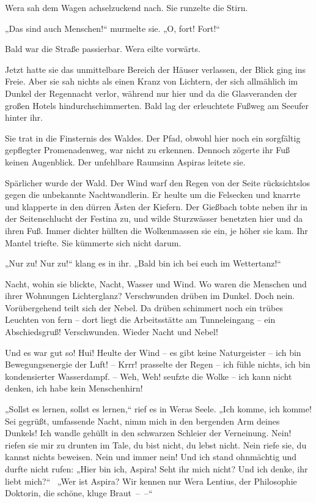 Wera sah dem Wagen achselzuckend nach. Sie runzelte die Stirn.

„Das sind auch Menschen!“ murmelte sie. „O, fort! Fort!“

Bald war die Straße passierbar. Wera eilte vorwärts.

Jetzt hatte sie das unmittelbare Bereich der Häuser verlassen, der
Blick ging ins Freie. Aber sie sah nichts als einen Kranz von
Lichtern, der sich allmählich im Dunkel der Regennacht verlor,
während nur hier und da die Glasveranden der großen Hotels
hindurchschimmerten. Bald lag der erleuchtete Fußweg am Seeufer
hinter ihr.

Sie trat in die Finsternis des Waldes. Der Pfad, obwohl hier noch
ein sorgfältig gepflegter Promenadenweg, war nicht zu erkennen.
Dennoch zögerte ihr Fuß keinen Augenblick. Der unfehlbare Raumsinn
Aspiras leitete sie.

Spärlicher wurde der Wald. Der Wind warf den Regen von der Seite
rücksichtslos gegen die unbekannte Nachtwandlerin. Er heulte um die
Felsecken und knarrte und klapperte in den dürren Ästen der
Kiefern. Der Gießbach tobte neben ihr in der Seitenschlucht der
Festina zu, und wilde Sturzwässer benetzten hier und da ihren Fuß.
Immer dichter hüllten die Wolkenmassen sie ein, je höher sie kam.
Ihr Mantel triefte. Sie kümmerte sich nicht darum.

„Nur zu! Nur zu!“ klang es in ihr. „Bald bin ich bei euch im
Wettertanz!“

Nacht, wohin sie blickte, Nacht, Wasser und Wind. Wo waren die
Menschen und ihrer Wohnungen Lichterglanz? Verschwunden drüben im
Dunkel. Doch nein. Vorübergehend teilt sich der Nebel. Da drüben
schimmert noch ein trübes Leuchten von fern – dort liegt die
Arbeitsstätte am Tunneleingang – ein Abschiedsgruß! Verschwunden.
Wieder Nacht und Nebel!

Und es war gut so! Hui! Heulte der Wind – es gibt keine
Naturgeister – ich bin Bewegungsenergie der Luft! – Krrr! prasselte
der Regen – ich fühle nichts, ich bin kondensierter Wasserdampf. –
Weh, Weh! seufzte die Wolke – ich kann nicht denken, ich habe kein
Menschenhirn!

„Sollst es lernen, sollst es lernen,“ rief es in Weras Seele. „Ich
komme, ich komme! Sei gegrüßt, umfassende Nacht, nimm mich in den
bergenden Arm deines Dunkels! Ich wandle gehüllt in den schwarzen
Schleier der Verneinung. Nein! riefen sie mir zu drunten im Tale,
du bist nicht, du lebst nicht. Nein riefe sie, du kannst nichts
beweisen. Nein und immer nein! Und ich stand ohnmächtig und durfte
nicht rufen: „Hier bin ich, Aspira! Seht ihr mich nicht? Und ich
denke, ihr liebt mich?“~ „Wer ist Aspira? Wir kennen nur Wera
Lentius, der Philosophie Doktorin, die schöne, kluge Braut~–~–“

